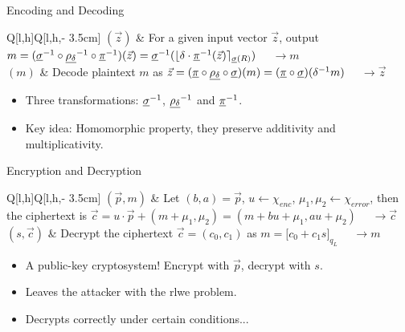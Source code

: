 \documentclass[aspectratio=169]{beamer}
\begin{document}
  \begin{frame}{Encoding and Decoding}
     \\
    \begin{tblr}{Q[l,h]Q[l,h,\textwidth - 3.5cm]}
      $(\vec{z})$ & {For a given input vector $\vec{z}$, output
          $m = (\underline{\sigma}^{-1} \circ \underline{\rho_\delta}^{-1} \circ \underline{\pi}^{-1})(\vec{z}) = \underline{\sigma}^{-1}(\lfloor \delta \cdot \underline{\pi}^{-1}(\vec{z})\rceil_{\underline{\sigma}(R)})$ $\quad\rightarrow m$} \\
      $(m)$ & {Decode plaintext $m$ as
          $\vec{z} = (\underline{\pi} \circ \underline{\rho_\delta} \circ \underline{\sigma})(m) = (\underline{\pi} \circ \underline{\sigma})(\delta^{-1} m)$
          $\quad\rightarrow \vec{z}$} \\
    \end{tblr}
    \begin{itemize}
      \item Three transformations: $\underline{\sigma}^{-1}$, $\underline{\rho_\delta}^{-1}$ and $\underline{\pi}^{-1}$.
      \item Key idea: Homomorphic property, they preserve additivity and multiplicativity.
    \end{itemize}
  \end{frame}

  \begin{frame}{Encryption and Decryption}
     \\
    \begin{tblr}{Q[l,h]Q[l,h,\textwidth - 3.5cm]}
      $(\vec{p}, m)$ & {
          Let $(b,a) = \vec{p}$, $u \leftarrow \chi_{enc}$, $\mu_1, \mu_2 \leftarrow \chi_{error}$,
          then the ciphertext is $\vec{c} = u \cdot \vec{p} + (m + \mu_1, \mu_2) = (m + bu + \mu_1, au + \mu_2)$
          $\quad\rightarrow \vec{c}$} \\
      $(s, \vec{c})$ & {
          Decrypt the ciphertext $\vec{c} = (c_0, c_1)$ as $m = \lbrack c_0 + c_1 s\rbrack_{q_L}$
          $\quad\rightarrow m$} \\
    \end{tblr}
    \begin{itemize}
      \item A public-key cryptosystem! Encrypt with $\vec{p}$, decrypt with $s$.
      \item Leaves the attacker with the \gls{rlwe} problem.
      \item Decrypts correctly under certain conditions...
    \end{itemize}
  \end{frame}
\end{document}
